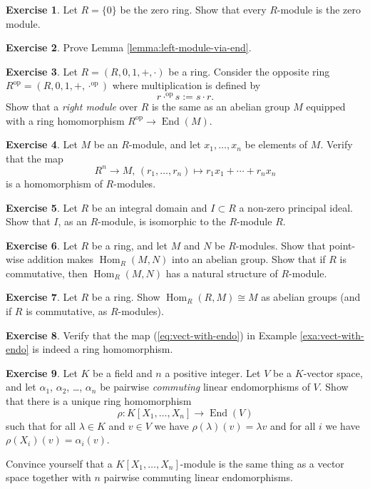 \documentclass[11pt]{amsbook}
\DeclareMathOperator{\End}{\mathrm{End}}
\DeclareMathOperator\Hom{Hom}
\def\opp{\mathrm{op}}
\theoremstyle{plain}
\theoremstyle{definition}
\newtheorem{exercise}{Exercise}
\begin{document}
\begin{exercise}
Let $R = \{0\}$ be the zero ring. Show that every $R$-module is the zero module.
\end{exercise}

\begin{exercise}\label{exc:left-module-via-end}
Prove Lemma \ref{lemma:left-module-via-end}.
\end{exercise}


\begin{exercise}Let $R=(R,0,1,+,\cdot)$ be a ring. Consider the opposite ring
$R^\opp=(R,0,1,+,\cdot^\opp)$ where multiplication is defined by
\[
	r \cdot^\opp s := s\cdot r.
\]
Show that  a \emph{right module} over $R$ is the same as an abelian group $M$ equipped with a ring homomorphism $R^\opp \to \End(M)$.
\end{exercise}

\begin{exercise}
Let $M$ be an $R$-module, and let $x_1,\ldots, x_n$ be elements of $M$. Verify that the map
\[
	R^n \to M,\, (r_1,\ldots, r_n) \mapsto r_1x_1 + \cdots + r_n x_n
\]
is a homomorphism of $R$-modules.
\end{exercise}

\begin{exercise}\label{exc:principal-ideal-in-domain}
Let $R$ be an integral domain and $I\subset R$ a non-zero principal ideal. Show that $I$, as an $R$-module, is isomorphic to the $R$-module $R$. 
\end{exercise}

\begin{exercise}Let $R$ be a ring, and let $M$ and $N$ be $R$-modules. Show that point-wise addition makes $\Hom_R(M,N)$ into an abelian group. Show that if $R$ is commutative, then $\Hom_R(M,N)$ has  a natural structure of $R$-module.
\end{exercise}

\begin{exercise}
Let $R$ be a ring. Show $\Hom_R(R,M) \cong M$ as abelian groups (and if $R$ is commutative, as $R$-modules).
\end{exercise}

\begin{exercise}\label{ex:vect-with-endo} Verify that the map (\ref{eq:vect-with-endo}) in Example \ref{exa:vect-with-endo} is indeed a ring homomorphism.
\end{exercise}

\begin{exercise}\label{exc:modules-over-multivariate-polynomial-ring}
Let $K$ be a field and $n$ a positive integer. Let $V$ be a $K$-vector space, and let $\alpha_1$, $\alpha_2$, \ldots, $\alpha_n$ be pairwise \emph{commuting} linear endomorphisms of $V$. Show that there is a unique ring homomorphism
\[
	\rho \colon K[X_1,\ldots,X_n] \to \End(V)
\]
such that for all $\lambda \in K$ and $v\in V$ we have $\rho(\lambda)(v)=\lambda v$ and for all $i$ we have $\rho(X_i)(v) = \alpha_i(v)$.

Convince yourself that a $K[X_1,\ldots,X_n]$-module is the same thing as a vector space together with $n$ pairwise commuting linear endomorphisms.
\end{exercise}
\end{document}
